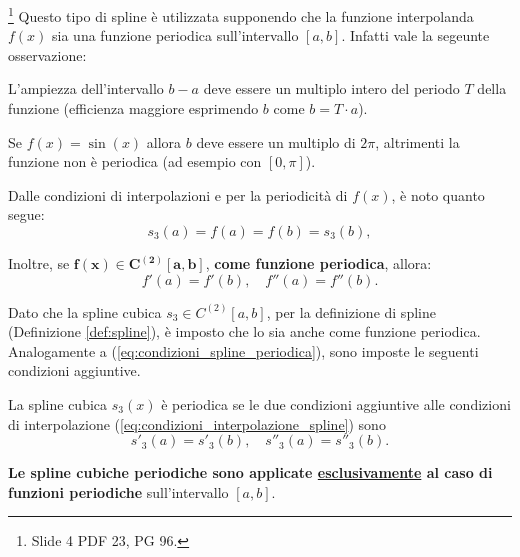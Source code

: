  \footnote{Slide 4 PDF 23, PG 96.}
Questo tipo di spline è utilizzata supponendo che la funzione interpolanda $f(x)$ sia una funzione periodica sull'intervallo $[a,b]$. Infatti vale la segeunte osservazione:

\begin{remark}
    L'ampiezza dell'intervallo $b-a$ deve essere un multiplo intero del periodo $T$ della funzione (efficienza maggiore esprimendo $b$ come $b=T\cdot a$).
\end{remark}

\begin{example}
    Se $f(x)=\sin(x)$ allora $b$ deve essere un multiplo di $2\pi$, altrimenti la funzione non è periodica (ad esempio con $[0,\pi]$).
\end{example}

Dalle condizioni di interpolazioni e per la periodicità di $f(x)$, è noto quanto segue:
\begin{equation*}
    s_3(a)=f(a)=f(b)=s_3(b),
\end{equation*}

Inoltre, se $\boldsymbol{f(x)\in C^{(2)}[a,b]}$, \textbf{come funzione periodica}, allora:
\begin{equation}\label{eq:condizioni_spline_periodica}
    f'(a)=f'(b),\quad f''(a)=f''(b).
\end{equation}

Dato che la spline cubica $s_3\in C^{(2)}[a,b]$, per la definizione di spline (Definizione \ref{def:spline}), è imposto che lo sia anche come funzione periodica. Analogamente a (\ref{eq:condizioni_spline_periodica}), sono imposte le seguenti condizioni aggiuntive.

\begin{definition}
	La spline cubica $s_3(x)$ è periodica se le due condizioni aggiuntive alle condizioni di interpolazione (\ref{eq:condizioni_interpolazione_spline}) sono
	\begin{equation}\label{eq:condizioni_spline_cubica_periodica}
	    \boxed{s'_3(a)=s'_3(b),\quad s''_3(a)=s''_3(b).}
	\end{equation}
\end{definition}

\begin{remark}
    \textbf{Le spline cubiche periodiche sono applicate \ul{esclusivamente} al caso di funzioni periodiche} sull'intervallo $[a,b]$.
\end{remark}

